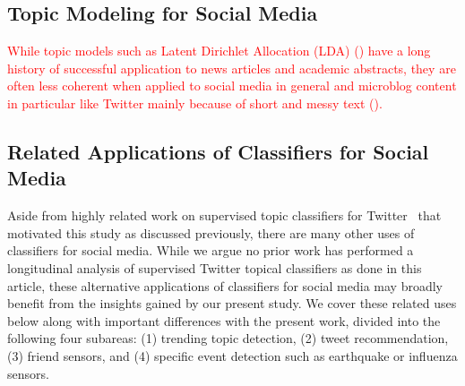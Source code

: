\subsection*{Topic Modeling for Social Media} 
\textcolor{red}{
While topic models such as Latent Dirichlet Allocation (LDA) (\cite{blei2003latent}) have a long history of successful application to news articles and academic abstracts, they are often less coherent when applied to social media in general and microblog content in particular like Twitter mainly because of short and messy text (\cite{sanner:sigir13}).
}


\subsection*{Related Applications of Classifiers for Social Media} 

Aside from highly related work on supervised topic classifiers for Twitter~\cite{lin2011smoothing,yang2014large,magdy} that motivated this study as discussed previously, there are many other uses of classifiers for social media.  While we
argue no prior work has performed a longitudinal analysis of supervised Twitter topical 
classifiers as done in this article, these alternative applications of classifiers for social media may broadly benefit from the insights gained by our present study.  We cover these related uses below along with important differences with the present work, divided into the following four subareas: (1) trending topic detection, (2) tweet recommendation, (3) friend
sensors, and (4) specific event detection such as earthquake or
influenza sensors.   

